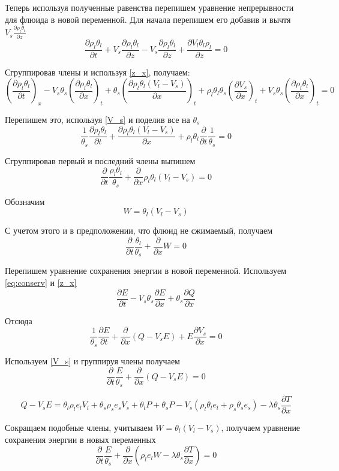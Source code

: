 \documentclass[12pt]{article}
\newcommand{\pd}[2]{\frac{\partial #1}{\partial #2}}
\begin{document}
Теперь используя полученные равенства перепишем уравнение непрерывности для флюида в новой переменной. Для начала перепишем его добавив и вычтя $V_s\pd{\rho_l\theta_l}{z} $
$$
\pd{\rho_l\theta_l}{t} + V_s\pd{\rho_l\theta_l}{z} - V_s\pd{\rho_l\theta_l}{z} + \pd{V_l\theta_l\rho_l}{z} =0
$$

Сгруппировав члены и используя \eqref{z_x}, получаем:
$$
\left(\pd{\rho_l\theta_l}{t}\right)_x - V_s\theta_s \left(\pd{\rho_l\theta_l}{x}\right)_t + \theta_s\left(\pd{\rho_l\theta_l(V_l - V_s)}{x}\right)_t + \rho_l\theta_l\theta_s\left(\pd{V_s}{x}\right)_t + V_s\theta_s \left(\pd{\rho_l\theta_l}{x}\right)_t = 0
$$

Перепишем это, используя \eqref{V_s} и поделив все на $\theta_s$
$$
\frac{1}{\theta_s}\pd{\rho_l\theta_l}{t} + \pd{\rho_l\theta_l(V_l-V_s)}{x} + \rho_l\theta_l\pd{}{t}\frac{1}{\theta_s} = 0
$$

Сгруппировав первый и последний члены выпишем
\begin{equation}
\pd{}{t}\frac{\rho_l\theta_l}{\theta_s} + \pd{}{x}\rho_l\theta_l(V_l - V_s) = 0
\label{filtr_compr}
\end{equation}

Обозначим 
\begin{equation}
W = \theta_l (V_l - V_s )
\label{W_filtr}
\end{equation}

С учетом этого и в предположении, что флюид не сжимаемый, получаем
\begin{equation}
\pd{}{t}\frac{\theta_l}{\theta_s} + \pd{}{x}W = 0
\label{filtr_compr}
\end{equation}

Перепишем уравнение сохранения энергии в новой переменной. Используем \eqref{eq:conserv} и \eqref{z_x}
$$
\pd{E}{t} - V_s\theta_s\pd{E}{x} + \theta_s\pd{Q}{x}
$$

Отсюда
$$
\frac{1}{\theta_s}\pd{E}{t} + \pd{}{x}(Q-V_s E) + E\pd{V_s}{x} = 0
$$

Используем \eqref{V_s} и группируя члены получаем
\begin{equation}
\pd{}{t}\frac{E}{\theta_s} + \pd{}{x}(Q - V_s E) = 0
\end{equation}

$$
Q-V_s E = \theta_l\rho_l e_l V_l + \theta_s\rho_s e_s V_s + \theta_l P + \theta_s P -V_s(\rho_l\theta_l e_l +\rho_s\theta_s e_s) - \lambda\theta_s\pd{T}{x}
$$

Сокращаем подобные члены, учитываем $W = \theta_l (V_l - V_s )$, получаем уравнение сохранения энергии в новых переменных
\begin{equation}
\pd{}{t}\frac{E}{\theta_s} + \pd{}{x}(\rho_l e_l W - \lambda\theta_s\pd{T}{x}) = 0
\label{eq:conserv_new}
\end{equation}
\end{document}
